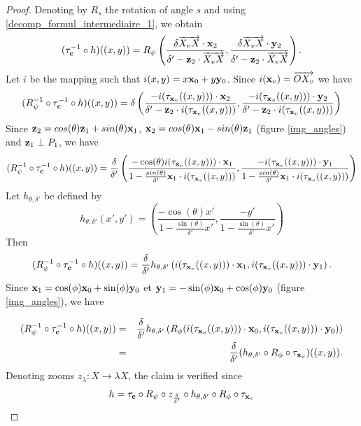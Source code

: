 \begin{proof}
\noindent Denoting by $R_{s}$ the rotation of angle $s$ and using  \eqref{decomp_formul_intermediaire_1}, we obtain
\begin{equation*}
(\tau_{\mathbf{c}}^{-1} \circ h)((x,y)) = R_{\psi}\left(\frac{\delta \overrightarrow{X_v X}\cdot \mathbf{x}_{2} }{\delta'-\mathbf{z}_2 \cdot \overrightarrow{X_v X}},\frac{\delta \overrightarrow{X_v X}\cdot \mathbf{y}_{2}}{\delta'-\mathbf{z}_2 \cdot \overrightarrow{X_v X}}  \right).
\end{equation*}
Let $i$ be the mapping such that $i(x,y)=x \mathbf{x}_0 + y \mathbf{y}_0$. Since $i(\mathbf{x}_v)=\overrightarrow{O X_v}$ we have
\begin{equation*}
(R_{\psi}^{-1} \circ \tau_{\mathbf{c}}^{-1}  \circ h)((x,y))=\delta \left(\frac{-i(\tau_{\mathbf{x}_v} ((x,y)))\cdot \mathbf{x}_{2} }{\delta'-\mathbf{z}_2 \cdot i(\tau_{\mathbf{x}_v} ((x,y)))},\frac{-i(\tau_{\mathbf{x}_v} ((x,y)))\cdot \mathbf{y}_{2}}{\delta'-\mathbf{z}_2 \cdot i(\tau_{\mathbf{x}_v} ((x,y)))}  \right) 
\end{equation*}
Since $\mathbf{z}_{2}=cos(\theta)\mathbf{z}_{1}+sin(\theta)\mathbf{x}_{1}$, $\mathbf{x}_{2}=cos(\theta)\mathbf{x}_{1}-sin(\theta)\mathbf{z}_{1}$ (figure \ref{img_angles}) and $\mathbf{z}_{1}\perp P_{1}$, we have
\begin{equation*}
(R_{\psi}^{-1} \circ \tau_{\mathbf{c}}^{-1}  \circ h)((x,y))=\frac{\delta}{\delta'}\left(\frac{-\cos(\theta)i(\tau_{\mathbf{x}_v} ((x,y)))\cdot \mathbf{x}_{1} }{1-\frac{sin(\theta)}{\delta'}\mathbf{x}_{1}\cdot i(\tau_{\mathbf{x}_v}((x,y)))}, \frac{-i(\tau_{\mathbf{x}_v} ((x,y)))\cdot \mathbf{y}_{1}}{1-\frac{sin(\theta)}{\delta'}\mathbf{x}_{1}\cdot i(\tau_{\mathbf{x}_v}((x,y)))}  \right) 
\end{equation*}
Let $h_{\theta,\delta'}$ be defined by
\begin{equation*}
h_{\theta,\delta'}(x',y')=\left(\frac{-\cos(\theta)x'}{1-\frac{\sin(\theta)}{\delta'}x'} ,\frac{-y'}{1-\frac{\sin(\theta)}{\delta'}x'}\right)
\end{equation*}
Then
\begin{equation*}
(R_{\psi}^{-1} \circ \tau_{\mathbf{c}}^{-1} \circ h)((x,y))= \frac{\delta}{\delta'}h_{\theta,\delta'}\left ( i(\tau_{\mathbf{x}_v}((x,y))) \cdot \mathbf{x}_{1}, i(\tau_{\mathbf{x}_v}((x,y))) \cdot \mathbf{y}_{1}\right).
\end{equation*}
\label{figure_de_rotations_18}
Since $\mathbf{x}_{1}=\cos(\phi)\mathbf{x}_{0}+\sin(\phi)\mathbf{y}_{0}$ et $\mathbf{y}_{1}=-\sin(\phi)\mathbf{x}_{0}+\cos(\phi)\mathbf{y}_{0}$ (figure \ref{img_angles}), we have

\begin{eqnarray*}
(R_{\psi}^{-1} \circ \tau_{\mathbf{c}}^{-1} \circ h)((x,y)) &=& \frac{\delta}{\delta'}h_{\theta,\delta'}\left ( R_{\phi}(i(\tau_{\mathbf{x}_v}((x,y))) \cdot \mathbf{x}_{0}, i(\tau_{\mathbf{x}_v}((x,y))) \cdot \mathbf{y}_{0})\right)\\
                                               &=&\frac{\delta}{\delta'} (h_{\theta,\delta'}\circ R_{\phi} \circ \tau_{\mathbf{x}_v})((x,y)).
\end{eqnarray*}
Denoting zooms $z_{\lambda}:X\rightarrow \lambda X$, the claim is verified since
\begin{equation*}
h = \tau_{\mathbf{c}} \circ R_{\psi} \circ z_{\frac{\delta}{\delta'}} \circ h_{\theta,\delta'} \circ R_{\phi} \circ \tau_{\mathbf{x}_v}
\end{equation*}
\end{proof}


